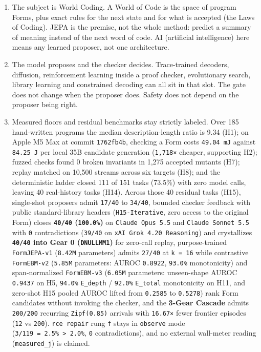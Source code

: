 \documentclass[10pt,letterpaper]{article}
\providecommand{\tightlist}{\setlength{\itemsep}{1pt}\setlength{\parskip}{0pt}}
\begin{document}
\begin{enumerate}
\def\labelenumi{\arabic{enumi}.}
\tightlist
\item
  The subject is World Coding. A World of Code is the space of program
  Forms, plus exact rules for the next state and for what is accepted
  (the Laws of Coding). JEPA is the premise, not the whole method:
  predict a summary of meaning instead of the next word of code. AI
  (artificial intelligence) here means any learned proposer, not one
  architecture.
\item
  The model proposes and the checker decides. Trace-trained decoders,
  diffusion, reinforcement learning inside a proof checker, evolutionary
  search, library learning and constrained decoding can all sit in that
  slot. The gate does not change when the proposer does. Safety does not
  depend on the proposer being right.
\item
  Measured floors and residual benchmarks stay strictly labeled. Over
  185 hand-written programs the median description-length ratio is 9.34
  (H1); on Apple M5 Max at commit \texttt{1762fb4b}, checking a Form
  costs \texttt{49.04\ mJ} against \texttt{84.25\ J} per local 35B
  candidate generation (\texttt{1,718×} cheaper, supporting H2); fuzzed
  checks found 0 broken invariants in 1,275 accepted mutants (H7);
  replay matched on 10,500 streams across six targets (H8); and the
  deterministic ladder closed 111 of 151 tasks (73.5\%) with zero model
  calls, leaving 40 real-history tasks (H14). Across those 40 residual
  tasks (H15), single-shot proposers admit \texttt{17/40} to
  \texttt{34/40}, bounded checker feedback with public standard-library
  headers (\texttt{H15-\allowbreak{}Iterative}, zero access to the original Form)
  closes \textbf{\texttt{40/40} (\texttt{100.0\%})} on
  \texttt{Claude\ Opus\ 5.\allowbreak{}5} and \texttt{Claude\ Sonnet\ 5.\allowbreak{}5} with
  \texttt{0} contradictions (\texttt{39/40} on
  \texttt{xAI\ Grok\ 4.\allowbreak{}20\ Reasoning}) and crystallizes
  \textbf{\texttt{40/40} into Gear 0 (\texttt{DNULLMM1})} for zero-call
  replay, purpose-trained \texttt{FormJEPA-\allowbreak{}v1} (\texttt{8.42M}
  parameters) admits \texttt{27/40} at \texttt{k\ =\ 16} while
  contrastive \texttt{FormEBM-\allowbreak{}v2} (\texttt{5.85M} parameters: AUROC
  \texttt{0.8922}, \texttt{93.0\%} monotonicity) and span-normalized
  \texttt{FormEBM-\allowbreak{}v3} (\texttt{6.05M} parameters: unseen-shape AUROC
  \texttt{0.9437} on H5, \texttt{94.0\%} \texttt{E\_depth} /
  \texttt{92.0\%} \texttt{E\_total} monotonicity on H11, and zero-shot
  H15 pooled AUROC lifted from \texttt{0.2585} to \texttt{0.5278}) rank
  Form candidates without invoking the checker, and the \textbf{3-Gear
  Cascade} admits \texttt{200/200} recurring \texttt{Zipf(\allowbreak{}0.\allowbreak{}85)}
  arrivals with \texttt{16.67×} fewer frontier episodes (\texttt{12} vs
  \texttt{200}). \texttt{rce\ repair} rung \texttt{f} stays in
  \texttt{observe} mode
  (\texttt{3/119\ =\ 2.5\%\ \textgreater{}\ 2.0\%}, \texttt{0}
  contradictions), and no external wall-meter reading
  (\texttt{measured\_\allowbreak{}j}) is claimed.
\end{enumerate}
\end{document}
